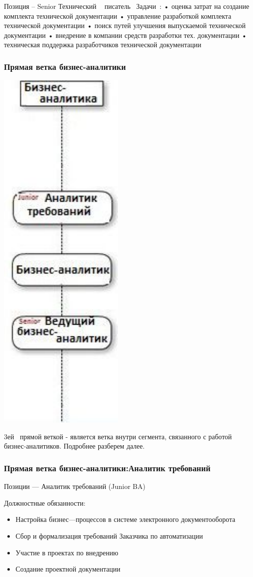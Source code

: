 \documentclass{../industrial-development}
\begin{document}
{\lecturenotes
Позиция – Senior Технический ~\cite{hh} писатель~\cite{itcf}
Задачи~\cite{rab}:
•	оценка затрат на создание комплекта технической документации 
•	управление разработкой комплекта технической документации
•	поиск путей улучшения выпускаемой технической документации 
•	внедрение в компании средств разработки тех. документации 
•	 техническая поддержка разработчиков технической документации


\begin{frame} \frametitle{Прямая ветка бизнес-аналитики }
  \centerline{\includegraphics[width=0.27\linewidth]{11-IT-specialist's-way/sch12c.pdf}}
\end{frame}

\lecturenotes
 3ей~\cite{mc} прямой веткой  - является ветка внутри сегмента, связанного с работой бизнес-аналитиков. Подробнее разберем далее.

\begin{frame} \frametitle{Прямая ветка бизнес-аналитики:Аналитик требований }
  \begin{block}{}
  \alert{Позиции --- Аналитик требований (Junior  BA) }

Должностные обязанности: 
  \end{block}
  \begin{itemize}
  \item  Настройка бизнес---процессов в системе электронного документооборота 
  \item  Сбор и формализация требований Заказчика по автоматизации
  \item Участие в проектах по внедрению 
 \item Создание проектной документации
  \end{itemize}
\end{frame}


}
\end{document}
